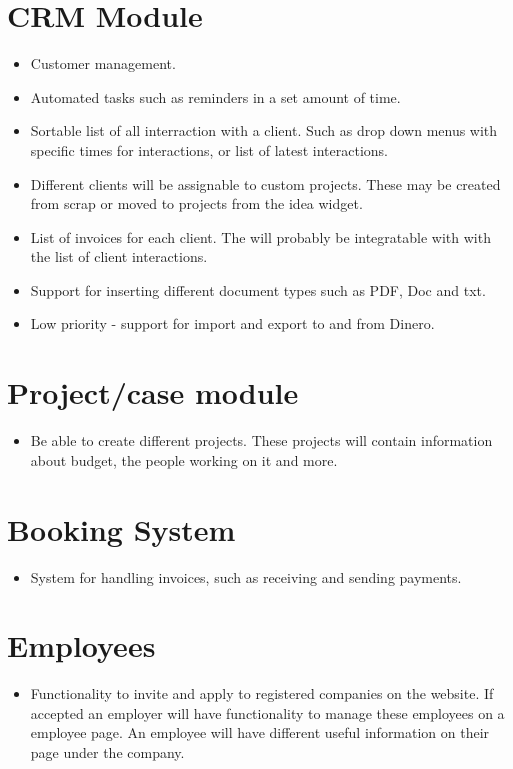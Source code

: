 \section{CRM Module}
\begin{itemize}
  \item Customer management.
  \item Automated tasks such as reminders in a set amount of time. 
  \item Sortable list of all interraction with a client. Such as drop down menus with specific times for interactions, or list of latest interactions.
  \item Different clients will be assignable to custom projects. These may be created from scrap or moved to projects from the idea widget.
  \item List of invoices for each client. The will probably be integratable with with the list of client interactions.
  \item Support for inserting different document types such as PDF, Doc and txt.
  \item Low priority - support for import and export to and from Dinero. 
\end{itemize}

\section{Project/case module}
\begin{itemize}
  \item Be able to create different projects. These projects will contain information about budget, the people working on it and more.
\end{itemize}

\section{Booking System}
\begin{itemize}
  \item System for handling invoices, such as receiving and sending payments.
\end{itemize}

\section{Employees}
\begin{itemize}
  \item Functionality to invite and apply to registered companies on the website. If accepted an employer will have functionality to manage these employees on a employee page. An employee will have different useful information on their page under the company.
\end{itemize}

